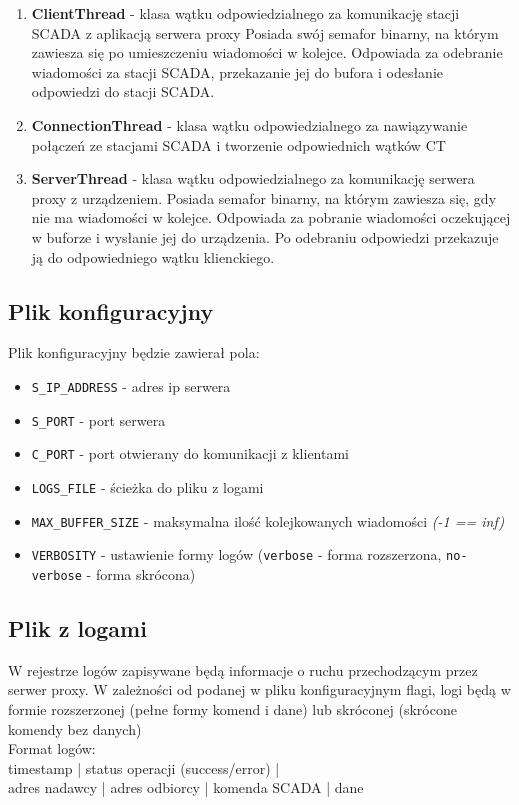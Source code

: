 \documentclass[a4paper]{article}
\begin{document}
\begin{enumerate}
\item \textbf{ClientThread} - klasa wątku odpowiedzialnego za komunikację stacji SCADA z aplikacją serwera proxy
Posiada swój semafor binarny, na którym zawiesza się po umieszczeniu wiadomości w kolejce.
Odpowiada za odebranie wiadomości za stacji SCADA, przekazanie jej do bufora i odesłanie odpowiedzi do stacji SCADA.
\item \textbf{ConnectionThread} - klasa wątku odpowiedzialnego za nawiązywanie połączeń ze stacjami SCADA i tworzenie odpowiednich wątków CT
\item \textbf{ServerThread} - klasa wątku odpowiedzialnego za komunikację serwera proxy z urządzeniem. Posiada semafor binarny, na którym zawiesza się, gdy nie ma wiadomości w kolejce.
Odpowiada za pobranie wiadomości oczekującej w buforze i wysłanie jej do urządzenia. Po odebraniu odpowiedzi przekazuje ją do odpowiedniego wątku klienckiego.
\end{enumerate}

\subsection{Plik konfiguracyjny}
Plik konfiguracyjny będzie zawierał pola:
\begin{itemize}
\item \texttt{S\_IP\_ADDRESS} - adres ip serwera
\item \texttt{S\_PORT} - port serwera
\item \texttt{C\_PORT} - port otwierany do komunikacji z klientami
\item \texttt{LOGS\_FILE} - ścieżka do pliku z logami
\item \texttt{MAX\_BUFFER\_SIZE} - maksymalna ilość kolejkowanych wiadomości \textit{(-1 == inf)}
\item \texttt{VERBOSITY} - ustawienie formy logów (\texttt{verbose} - forma rozszerzona, \texttt{no-verbose} - forma skrócona)
\end{itemize}

\subsection{Plik z logami}
W rejestrze logów zapisywane będą informacje o ruchu przechodzącym przez serwer proxy. W zależności od podanej w pliku konfiguracyjnym flagi, logi będą w formie rozszerzonej (pełne formy komend i dane) lub skróconej (skrócone komendy bez danych)\\

Format logów:\\
timestamp | status operacji (success/error) |\\adres nadawcy | adres odbiorcy | komenda SCADA | dane
\end{document}
